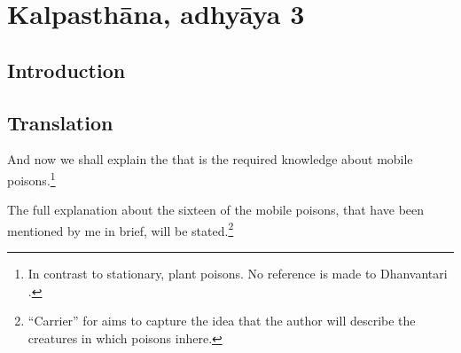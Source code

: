 \section{Kalpasthāna, adhyāya 3}

\subsection{Introduction}

\subsection{Translation}

\begin{translation}
    \item[1] And now we shall explain the  that is the required
knowledge about mobile poisons.\footnote{In contrast to stationary, plant
    poisons.  No reference is made to Dhanvantari
    \citep[see][]{birc-2021}.}


\item[3] 

The full explanation about the sixteen  of the mobile
poisons, that have been mentioned by me in brief, will be
stated.\footnote{“Carrier” for  aims to capture
    the idea that the author will describe the creatures in which poisons inhere.}
 

\end{translation}
